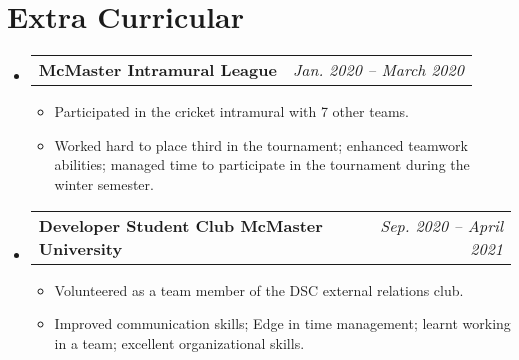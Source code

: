 \documentclass[letterpaper,11pt]{article}
\makeatletter
\newcommand{\resumeItem}[1]{
  \item\small{
    {#1 \vspace{-2pt}}
  }
}
\newcommand{\resumeProjectHeading}[2]{
    \item
    \begin{tabular*}{0.97\textwidth}{l@{\extracolsep{\fill}}r}
      \small#1 & #2 \\
    \end{tabular*}\vspace{-7pt}
}
\newcommand{\resumeSubHeadingListStart}{\begin{itemize}[leftmargin=0.15in, label={}]}
\newcommand{\resumeSubHeadingListEnd}{\end{itemize}}
\newcommand{\resumeItemListStart}{\begin{itemize}}
\newcommand{\resumeItemListEnd}{\end{itemize}\vspace{-5pt}}
\makeatother
\begin{document}
\section{Extra Curricular}
  \resumeSubHeadingListStart
    \resumeProjectHeading
          {\textbf{McMaster Intramural League}}{\small \textit{Jan. 2020 -- March 2020}}
      \resumeItemListStart
        \resumeItem{Participated in the cricket intramural with 7 other teams.}
        \resumeItem{Worked hard to place third in the tournament; enhanced teamwork abilities; managed time to participate in the tournament during the winter semester.}
      \resumeItemListEnd
    \resumeProjectHeading
          {\textbf{Developer Student Club McMaster University}}{\small \textit{Sep. 2020 -- April 2021}}
      \resumeItemListStart
        \resumeItem{Volunteered as a team member of the DSC external relations club.}
        \resumeItem{Improved communication skills; Edge in time management; learnt working in a team; excellent organizational skills.}
      \resumeItemListEnd
  \resumeSubHeadingListEnd

\end{document}

